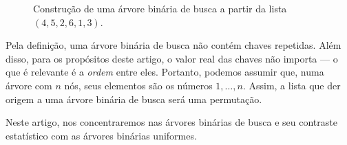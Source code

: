 \begin{figure}[h]
    \centering
    \caption{
        Construção de uma árvore binária de busca a partir da lista $(4, 5, 2, 6, 1, 3)$.
    }
    \label{fig:bst-construction}
\end{figure}

Pela definição,
uma árvore binária de busca não contém chaves repetidas.
Além disso,
para os propósitos deste artigo,
o valor real das chaves não importa
--- o que é relevante é a \emph{ordem} entre eles.
Portanto,
podemos assumir que,
numa árvore com $n$ nós,
seus elementos são os números $1, \dots, n$.
Assim,
a lista que der origem a uma árvore binária de busca
será uma permutação.

Neste artigo,
nos concentraremos nas árvores binárias de busca
e seu contraste estatístico com as árvores binárias uniformes.
